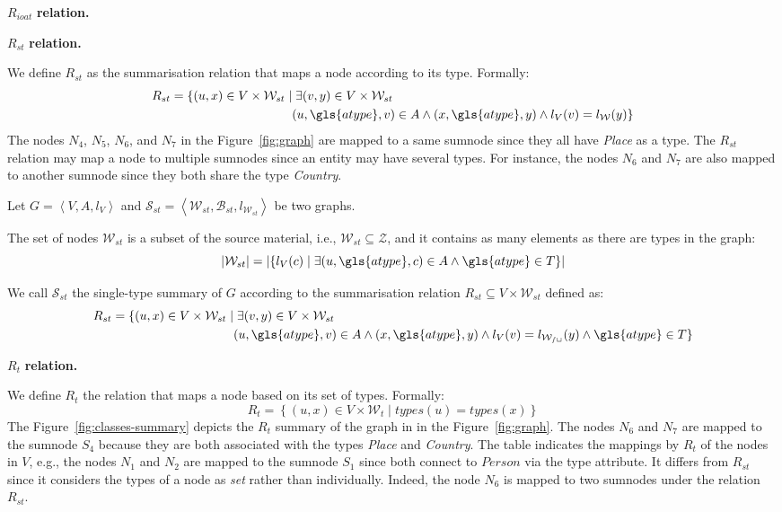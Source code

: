 \begin{labeling}{$R_{ioat}$ \textbf{relation.}}
\item[$R_{st}$ \textbf{relation.}]

We define $R_{st}$ as the summarisation relation that maps a node according to its type. Formally:
$$
\begin{aligned}
R_{st} = \{ (u, x) \in V \times \mathcal{W}_{st} \mid &\; \exists (v,y) \in V \times \mathcal{W}_{st} \\
 & (u,\gls{atype},v) \in A \wedge (x,\gls{atype},y) \wedge l_V(v) = l_\mathcal{W}(y) \}
\end{aligned}
$$
The nodes $N_4$, $N_5$, $N_6$, and $N_7$ in the Figure~\ref{fig:graph} are mapped to a same sumnode since they all have \emph{Place} as a type. The $R_{st}$ relation may map a node to multiple sumnodes since an entity may have several types. For instance, the nodes $N_6$ and $N_7$ are also mapped to another sumnode since they both share the type \emph{Country}.

\begin{definition}
Let $G=\left\langle V, A, l_V \right\rangle$ and $\mathcal{S}_{st} = \left\langle \mathcal{W}_{st}, \mathcal{B}_{st}, l_{\mathcal{W}_{st}} \right\rangle$ be two graphs.

The set of nodes $\mathcal{W}_{st}$ is a subset of the source material, i.e., $\mathcal{W}_{st} \subseteq \mathcal{Z}$, and it contains as many elements as there are types in the graph:
$$
\lvert \mathcal{W}_{st} \rvert = \lvert \left\lbrace l_V(c) \mid \exists (u, \gls{atype}, c) \in A \wedge \gls{atype} \in T \right\rbrace \rvert
$$

We call $\mathcal{S}_{st}$ the single-type summary of $G$ according to the summarisation relation $R_{st} \subseteq V \times \mathcal{W}_{st}$ defined as:
$$
\begin{aligned}
R_{st} = \{ (u, x) \in V \times \mathcal{W}_{st} \mid &\; \exists (v, y) \in V \times \mathcal{W}_{st} \\
	& (u,\gls{atype},v) \in A \wedge (x,\gls{atype},y) \wedge l_V(v) = l_\mathcal{W_{st}}(y) \wedge \gls{atype} \in T \}
\end{aligned}
$$
\end{definition}

\item[$R_t$ \textbf{relation.}]

We define $R_t$ the relation that maps a node based on its set of types. Formally:
$$
R_t = \left\lbrace (u, x) \in V \times \mathcal{W}_t \mid types(u) = types(x) \right\rbrace
$$
The Figure~\ref{fig:classes-summary} depicts the $R_t$ summary of the graph in in the Figure~\ref{fig:graph}. The nodes $N_6$ and $N_7$ are mapped to the sumnode $S_4$ because they are both associated with the types \emph{Place} and \emph{Country}. The table indicates the mappings by $R_t$ of the nodes in $V$, e.g., the nodes $N_1$ and $N_2$ are mapped to the sumnode $S_1$ since both connect to $Person$ via the type attribute. It differs from $R_{st}$ since it considers the types of a node as \emph{set} rather than individually. Indeed, the node $N_6$ is mapped to two sumnodes under the relation $R_{st}$.


\end{labeling}
